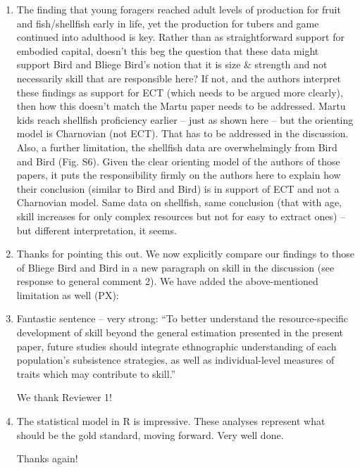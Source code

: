 \documentclass{article}
\newcommand{\rev}[1]{{\color{ForestGreen}#1}}
\begin{document}
\begin{enumerate}
    \item The finding that young foragers reached adult levels of production for fruit and fish/shellfish early in life, yet the production for tubers and game continued into adulthood is key. Rather than as straightforward support for embodied capital, doesn’t this beg the question that these data might support Bird and Bliege Bird’s notion that it is size \& strength and not necessarily skill that are responsible here? If not, and the authors interpret these findings as support for ECT (which needs to be argued more clearly), then how this doesn’t match the Martu paper needs to be addressed. Martu kids reach shellfish proficiency earlier – just as shown here – but the orienting model is Charnovian (not ECT). That has to be addressed in the discussion. Also, a further limitation, the shellfish data are overwhelmingly from Bird and Bird (Fig. S6). Given the clear orienting model of the authors of those papers, it puts the responsibility firmly on the authors here to explain how their conclusion (similar to Bird and Bird) is in support of ECT and not a Charnovian model. Same data on shellfish, same conclusion (that with age, skill increases for only complex resources but not for easy to extract ones) – but different interpretation, it seems. 
\item \rev{Thanks for pointing this out. We now explicitly compare our findings to those of Bliege Bird and Bird in a new paragraph on skill in the discussion (see response to general comment 2). We have added the above-mentioned limitation as well (PX):
 }

    \item Fantastic sentence – very strong: “To better understand the resource-specific development of skill beyond the general estimation presented in the present paper, future studies should integrate ethnographic understanding of each population’s subsistence strategies, as well as individual-level measures of traits which may contribute to skill.”
    
\rev{We thank Reviewer 1!}
    
    \item The statistical model in R is impressive. These analyses represent what should be the gold standard, moving forward. Very well done.

\rev{Thanks again!}

\end{enumerate}
\end{document}
